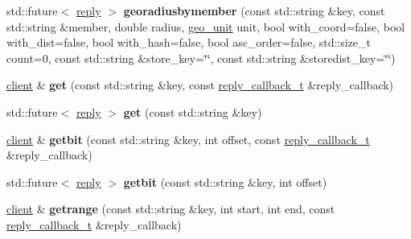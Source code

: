 \begin{DoxyCompactItemize}
\item 
\mbox{\label{classcpp__redis_1_1client_af4bc0403124cbf5e7f6341bbb160d08b}} 
std\+::future$<$ \mbox{\hyperlink{classcpp__redis_1_1reply}{reply}} $>$ {\bfseries georadiusbymember} (const std\+::string \&key, const std\+::string \&member, double radius, \mbox{\hyperlink{classcpp__redis_1_1client_aa5998536fd32ff4387c89be514997620}{geo\+\_\+unit}} unit, bool with\+\_\+coord=false, bool with\+\_\+dist=false, bool with\+\_\+hash=false, bool asc\+\_\+order=false, std\+::size\+\_\+t count=0, const std\+::string \&store\+\_\+key=\char`\"{}\char`\"{}, const std\+::string \&storedist\+\_\+key=\char`\"{}\char`\"{})
\item 
\mbox{\label{classcpp__redis_1_1client_a1521d8c4c751d970c446aae7ccf8cc35}} 
\mbox{\hyperlink{classcpp__redis_1_1client}{client}} \& {\bfseries get} (const std\+::string \&key, const \mbox{\hyperlink{classcpp__redis_1_1client_af7a65eb21aa25230bfbb0b0203c4fc04}{reply\+\_\+callback\+\_\+t}} \&reply\+\_\+callback)
\item 
\mbox{\label{classcpp__redis_1_1client_af2f987e43e139b21df2138a541b766f8}} 
std\+::future$<$ \mbox{\hyperlink{classcpp__redis_1_1reply}{reply}} $>$ {\bfseries get} (const std\+::string \&key)
\item 
\mbox{\label{classcpp__redis_1_1client_ad57b10f052814a2a15d4687e34d2be72}} 
\mbox{\hyperlink{classcpp__redis_1_1client}{client}} \& {\bfseries getbit} (const std\+::string \&key, int offset, const \mbox{\hyperlink{classcpp__redis_1_1client_af7a65eb21aa25230bfbb0b0203c4fc04}{reply\+\_\+callback\+\_\+t}} \&reply\+\_\+callback)
\item 
\mbox{\label{classcpp__redis_1_1client_a43caae473008353b5ddc74a8fb36298c}} 
std\+::future$<$ \mbox{\hyperlink{classcpp__redis_1_1reply}{reply}} $>$ {\bfseries getbit} (const std\+::string \&key, int offset)
\item 
\mbox{\label{classcpp__redis_1_1client_a28b3fe6983918c6fc5549f1310742df1}} 
\mbox{\hyperlink{classcpp__redis_1_1client}{client}} \& {\bfseries getrange} (const std\+::string \&key, int start, int end, const \mbox{\hyperlink{classcpp__redis_1_1client_af7a65eb21aa25230bfbb0b0203c4fc04}{reply\+\_\+callback\+\_\+t}} \&reply\+\_\+callback)

\end{DoxyCompactItemize}
